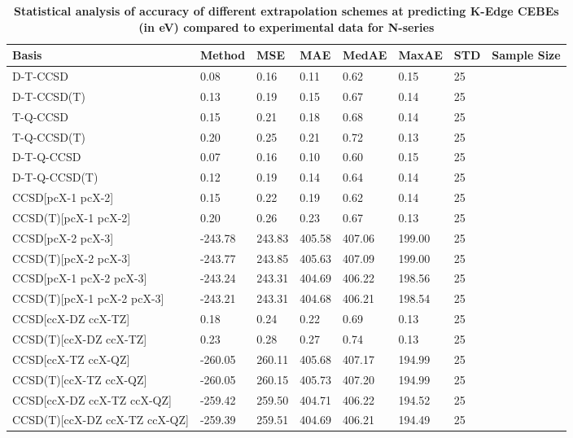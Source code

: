 \begin{table}
  \caption{\textbf{Statistical analysis of accuracy of different extrapolation schemes at predicting K-Edge CEBEs (in eV) compared to experimental data for N-series}}
  \label{tbl:extrap-scheme-summary-n}
  \begin{tabular}{l l l l l l l l }
    \toprule
    \textbf{Basis} & \textbf{Method} & \textbf{MSE} & \textbf{MAE} & \textbf{MedAE} & \textbf{MaxAE} & \textbf{STD} & \textbf{Sample Size} \\ 
    \midrule
    D-T-CCSD & 0.08 & 0.16 & 0.11 & 0.62 & 0.15 & 25 \\ 
    D-T-CCSD(T) & 0.13 & 0.19 & 0.15 & 0.67 & 0.14 & 25 \\ 
    T-Q-CCSD & 0.15 & 0.21 & 0.18 & 0.68 & 0.14 & 25 \\ 
    T-Q-CCSD(T) & 0.20 & 0.25 & 0.21 & 0.72 & 0.13 & 25 \\ 
    D-T-Q-CCSD & 0.07 & 0.16 & 0.10 & 0.60 & 0.15 & 25 \\ 
    D-T-Q-CCSD(T) & 0.12 & 0.19 & 0.14 & 0.64 & 0.14 & 25 \\ 
    CCSD[pcX-1 pcX-2] & 0.15 & 0.22 & 0.19 & 0.62 & 0.14 & 25 \\ 
    CCSD(T)[pcX-1 pcX-2] & 0.20 & 0.26 & 0.23 & 0.67 & 0.13 & 25 \\ 
    CCSD[pcX-2 pcX-3] & -243.78 & 243.83 & 405.58 & 407.06 & 199.00 & 25 \\ 
    CCSD(T)[pcX-2 pcX-3] & -243.77 & 243.85 & 405.63 & 407.09 & 199.00 & 25 \\ 
    CCSD[pcX-1 pcX-2 pcX-3] & -243.24 & 243.31 & 404.69 & 406.22 & 198.56 & 25 \\ 
    CCSD(T)[pcX-1 pcX-2 pcX-3] & -243.21 & 243.31 & 404.68 & 406.21 & 198.54 & 25 \\ 
    CCSD[ccX-DZ ccX-TZ] & 0.18 & 0.24 & 0.22 & 0.69 & 0.13 & 25 \\ 
    CCSD(T)[ccX-DZ ccX-TZ] & 0.23 & 0.28 & 0.27 & 0.74 & 0.13 & 25 \\ 
    CCSD[ccX-TZ ccX-QZ] & -260.05 & 260.11 & 405.68 & 407.17 & 194.99 & 25 \\ 
    CCSD(T)[ccX-TZ ccX-QZ] & -260.05 & 260.15 & 405.73 & 407.20 & 194.99 & 25 \\ 
    CCSD[ccX-DZ ccX-TZ ccX-QZ] & -259.42 & 259.50 & 404.71 & 406.22 & 194.52 & 25 \\ 
    CCSD(T)[ccX-DZ ccX-TZ ccX-QZ] & -259.39 & 259.51 & 404.69 & 406.21 & 194.49 & 25 \\ 
    \bottomrule
  \end{tabular}
\end{table}
